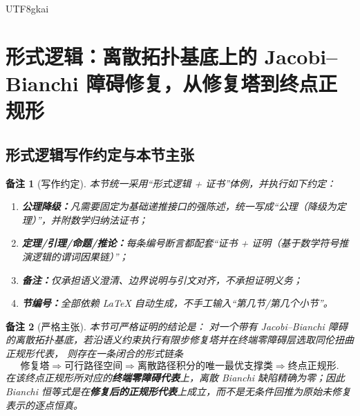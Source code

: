 \documentclass[12pt]{article}
\newtheorem{remark}{备注}[section]
\begin{document}
\begin{CJK*}{UTF8}{gkai}
\setcounter{tocdepth}{3}
\setcounter{secnumdepth}{3}
\tableofcontents
\clearpage

\section{形式逻辑：离散拓扑基底上的 Jacobi--Bianchi 障碍修复，从修复塔到终点正规形}
\label{sec:tex38-ch1}
\label{chap:tex38-main}

\subsection{形式逻辑写作约定与本节主张}
\label{sec:tex38-convention}

\begin{remark}[写作约定]
本节统一采用“形式逻辑 + 证书”体例，并执行如下约定：
\begin{enumerate}
  \item \textbf{公理降级：}凡需要固定为基础递推接口的强陈述，统一写成“公理（降级为定理）”，并附数学归纳法证书；
  \item \textbf{定理/引理/命题/推论：}每条编号断言都配套“证书 + 证明（基于数学符号推演逻辑的谓词因果链）”；
  \item \textbf{备注：}仅承担语义澄清、边界说明与引文对齐，不承担证明义务；
  \item \textbf{节编号：}全部依赖 \LaTeX{} 自动生成，不手工输入“第几节/第几个小节”。
\end{enumerate}
\end{remark}

\begin{remark}[严格主张]
本节可严格证明的结论是：
对一个带有 Jacobi--Bianchi 障碍的离散拓扑基底，若沿语义约束执行有限步修复塔并在终端零障碍层选取同伦扭曲正规形代表，
则存在一条闭合的形式链条
\[
  \text{修复塔}
  \Longrightarrow
  \text{可行路径空间}
  \Longrightarrow
  \text{离散路径积分的唯一最优支撑类}
  \Longrightarrow
  \text{终点正规形}.
\]
在该终点正规形所对应的\textbf{终端零障碍代表}上，离散 Bianchi 缺陷精确为零；因此 Bianchi 恒等式是在\textbf{修复后的正规形代表}上成立，而不是无条件回推为原始未修复表示的逐点恒真。
\end{remark}


\end{CJK*}
\end{document}
